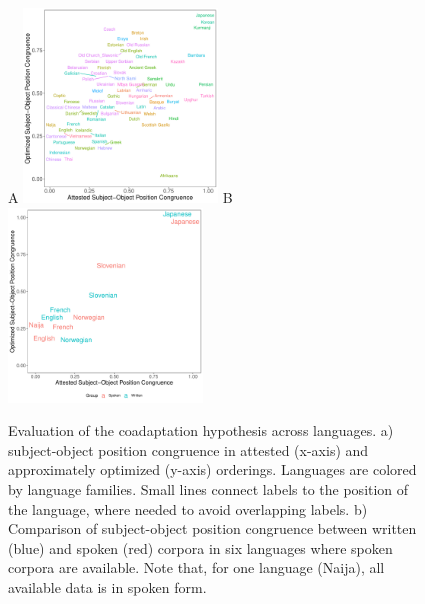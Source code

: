 \documentclass[11pt,a4paper]{article}
\begin{document}


\begin{figure}
    \centering
    A
    \includegraphics[width=0.46\textwidth]{../analysis/figures/fracion-optimized_DLM_2.6_format.pdf}
    B
    \includegraphics[width=0.46\textwidth]{../analysis/analysis_spoken/spoken.pdf}
    \caption{Evaluation of the coadaptation hypothesis across languages. a) subject-object position congruence in attested (x-axis) and approximately optimized (y-axis) orderings. Languages are colored by language families. Small lines connect labels to the position of the language, where needed to avoid overlapping labels. b) Comparison of subject-object position congruence between written (blue) and spoken (red) corpora in six languages where spoken corpora are available. Note that, for one language (Naija), all available data is in spoken form.}
    \label{fig:study1}\label{fig:spoken}
\end{figure}


\end{document}
